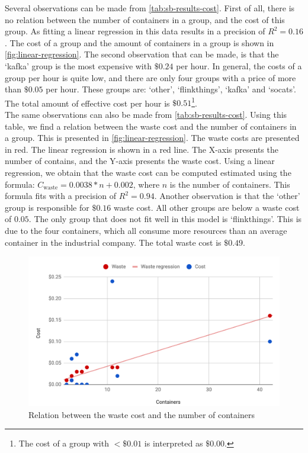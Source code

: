 \noindent
Several observations can be made from \autoref{tab:sb-results-cost}. First of all, there is no relation between the number of containers in a group, and the cost of this group. As fitting a linear regression in this data results in a precision of $R^2 = 0.16$. The cost of a group and the amount of containers in a group is shown in \autoref{fig:linear-regression}. The second observation that can be made, is that the `kafka' group is the most expensive with $\$ 0.24$ per hour. In general, the costs of a group per hour is quite low, and there are only four groups with a price of more than $\$0.05$ per hour. These groups are: `other', `flinkthings', `kafka' and `socats'. The total amount of effective cost per hour is $\$0.51$\footnote{The cost of a group with $<\$0.01$ is interpreted as $\$0.00$.}.\\

\noindent
The same observations can also be made from \autoref{tab:sb-results-cost}. Using this table, we find a relation between the waste cost and the number of containers in a group. This is presented in \autoref{fig:linear-regression}. The waste costs are presented in red. The linear regression is shown in a red line. The X-axis presents the number of contains, and the Y-axis presents the waste cost. Using a linear regression, we obtain that the waste cost can be computed estimated using the formula: $C_\text{waste} = 0.0038*n + 0.002$, where $n$ is the number of containers. This formula fits with a precision of $R^2 = 0.94$. Another observation is that the `other' group is responsible for $\$0.16$ waste cost. All other groups are below a waste cost of $0.05$. The only group that does not fit well in this model is `flinkthings'. This is due to the four containers, which all consume more resources than an average container in the industrial company. The total waste cost is $\$0.49$.\\


\begin{figure}
    \centering
    \includegraphics[width=\textwidth]{gfx/linear-regression.png}
    \caption{Relation between the waste cost and the number of containers}
    \label{fig:linear-regression}
\end{figure}

